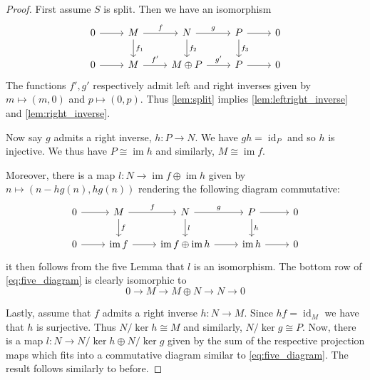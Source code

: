 \documentclass[12pt]{article}
\theoremstyle{plain}
\theoremstyle{definition}
\newcommand{\lto}{\longrightarrow}
\begin{document}
\begin{proof}
First assume $S$ is split. Then we have an isomorphism
\begin{equation}
\begin{tikzcd}
0\arrow[r] & M\arrow[d,"{f_1}"]\arrow[r,"f"] & N\arrow[d,"{f_2}"]\arrow[r,"g"] & P\arrow[d,"{f_3}"]\arrow[r] & 0\\
0\arrow[r] & M\arrow[r,"f'"] & M \oplus P\arrow[r,"g'"] & P\arrow[r] & 0
\end{tikzcd}
\end{equation}
The functions $f',g'$ respectively admit left and right inverses given by $m \longmapsto (m,0)$ and $p \longmapsto(0,p)$. Thus \eqref{lem:split} implies \eqref{lem:leftright_inverse} and \eqref{lem:right_inverse}.

Now say $g$ admits a right inverse, $h: P \lto N$. We have $g h = \operatorname{id}_P$ and so $h$ is injective. We thus have $P \cong \operatorname{im}h$ and similarly, $M \cong \operatorname{im}f$.

Moreover, there is a map $l: N \lto \operatorname{im}f \oplus \operatorname{im}h$ given by $n \longmapsto (n - hg(n),hg(n))$ rendering the following diagram commutative:
\begin{equation}\label{eq:five_diagram}
\begin{tikzcd}
0\arrow[r] & M\arrow[r,"f"]\arrow[d,"{f}"] & N\arrow[r,"g"] \arrow[d,"l"]& P\arrow[d,"{h}"]\arrow[r] & 0\\
0\arrow[r] & \operatorname{im}f\arrow[r] & \operatorname{im}f \oplus \operatorname{im}h\arrow[r] & \operatorname{im}h\arrow[r] & 0
\end{tikzcd}
\end{equation}
it then follows from the five Lemma that $l$ is an isomorphism. The bottom row of \eqref{eq:five_diagram} is clearly isomorphic to
\begin{equation}
0 \lto M \lto M \oplus N \lto N \lto 0
\end{equation}

Lastly,  assume that $f$ admits a right inverse $h: N \lto M$. Since $h f = \operatorname{id}_M$ we have that $h$ is surjective. Thus $N/\operatorname{ker}h \cong M$ and similarly, $N/\operatorname{ker}g \cong P$. Now, there is a map $l: N \lto N/\operatorname{ker}h \oplus N/\operatorname{ker}g$ given by the sum of the respective projection maps which fits into a commutative diagram similar to \eqref{eq:five_diagram}. The result follows similarly to before.
\end{proof}
\end{document}
